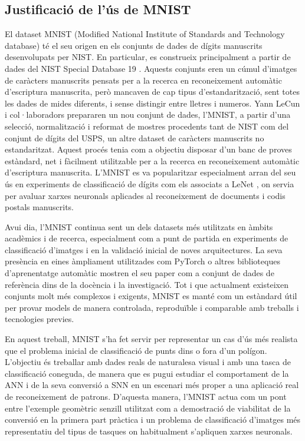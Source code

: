 \documentclass[a4paper,11pt, titlepage, twoside]{article}
\begin{document}
\subsection{Justificació de l'ús de MNIST}
El dataset MNIST (Modified National Institute of Standards and Technology database) té el seu origen en els conjunts de dades de dígits manuscrits desenvolupats per NIST. En particular, es construeix principalment a partir de dades del NIST Special Database 19 \cite{NISTSD19}. Aquests conjunts eren un cúmul d'imatges de caràcters manuscrits pensats per a la recerca en reconeixement automàtic d'escriptura manuscrita, però mancaven de cap tipus d'estandarització, sent totes les dades de mides diferents, i sense distingir entre lletres i numeros. Yann LeCun i col·laboradors prepararen un nou conjunt de dades, l'MNIST, a partir d'una selecció, normalització i reformat de mostres procedents tant de NIST com del conjunt de dígits del USPS, un altre dataset de caràcters manuscrits no estandaritzat. Aquest procés tenia com a objectiu disposar d'un banc de proves estàndard, net i fàcilment utilitzable per a la recerca en reconeixement automàtic d'escriptura manuscrita. L'MNIST es va popularitzar especialment arran del seu ús en experiments de classificació de dígits com els associats a LeNet \cite{LeCun1989}, on servia per avaluar xarxes neuronals aplicades al reconeixement de documents i codis postals manuscrits.

Avui dia, l'MNIST continua sent un dels datasets més utilitzats en àmbits acadèmics i de recerca, especialment com a punt de partida en experiments de classificació d'imatges i en la validació inicial de noves arquitectures. La seva presència en eines àmpliament utilitzades com PyTorch o altres biblioteques d'aprenentatge automàtic mostren el seu paper com a conjunt de dades de referència dins de la docència i la investigació. Tot i que actualment existeixen conjunts molt més complexos i exigents, MNIST es manté com un estàndard útil per provar models de manera controlada, reproduïble i comparable amb treballs i tecnologies previes.

En aquest treball, MNIST s'ha fet servir per representar un cas d'ús més realista que el problema inicial de classificació de punts dins o fora d'un polígon. L'objectiu és treballar amb dades reals de naturalesa visual i amb una tasca de classificació coneguda, de manera que es pugui estudiar el comportament de la ANN i de la seva conversió a SNN en un escenari més proper a una aplicació real de reconeixement de patrons. D'aquesta manera, l'MNIST actua com un pont entre l'exemple geomètric senzill utilitzat com a demostració de viabilitat de la conversió en la primera part pràctica i un problema de classificació d'imatges més representatiu del tipus de tasques on habitualment s'apliquen xarxes neuronals.
\end{document}
